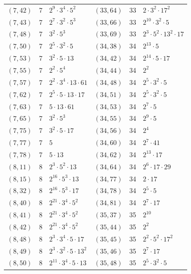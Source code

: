 \documentclass[11pt]{article}
\begin{document}
\begin{longtable}{@{}lrl@{\qquad}lrl@{}}
$(7,42)$ & 7 & $2^{9}\cdot 3^{4}\cdot 5^{2}$ & $(33,64)$ & 33 & $2\cdot 3^{2}\cdot 17^{2}$\\
$(7,43)$ & 7 & $2^{7}\cdot 3^{2}\cdot 5^{3}$ & $(33,66)$ & 33 & $2^{10}\cdot 3^{2}\cdot 5$\\
$(7,48)$ & 7 & $3^{2}\cdot 5^{3}$ & $(33,69)$ & 33 & $2^{3}\cdot 5^{2}\cdot 13^{2}\cdot 17$\\
$(7,50)$ & 7 & $2^{5}\cdot 3^{2}\cdot 5$ & $(34,38)$ & 34 & $2^{13}\cdot 5$\\
$(7,53)$ & 7 & $3^{2}\cdot 5\cdot 13$ & $(34,42)$ & 34 & $2^{14}\cdot 5\cdot 17$\\
$(7,55)$ & 7 & $2^{2}\cdot 5^{4}$ & $(34,44)$ & 34 & $2^{2}$\\
$(7,57)$ & 7 & $2^{2}\cdot 3^{4}\cdot 13\cdot 61$ & $(34,48)$ & 34 & $2^{5}\cdot 3^{2}\cdot 5$\\
$(7,62)$ & 7 & $2^{5}\cdot 5\cdot 13\cdot 17$ & $(34,51)$ & 34 & $2^{5}\cdot 3^{2}\cdot 5$\\
$(7,63)$ & 7 & $5\cdot 13\cdot 61$ & $(34,53)$ & 34 & $2^{7}\cdot 5$\\
$(7,65)$ & 7 & $3^{2}\cdot 5^{3}$ & $(34,55)$ & 34 & $2^{9}\cdot 5$\\
$(7,75)$ & 7 & $3^{2}\cdot 5\cdot 17$ & $(34,56)$ & 34 & $2^{4}$\\
$(7,77)$ & 7 & $5$ & $(34,60)$ & 34 & $2^{7}\cdot 41$\\
$(7,78)$ & 7 & $5\cdot 13$ & $(34,62)$ & 34 & $2^{13}\cdot 17$\\
$(8,11)$ & 8 & $2^{3}\cdot 5^{2}\cdot 13$ & $(34,64)$ & 34 & $2^{6}\cdot 17\cdot 29$\\
$(8,15)$ & 8 & $2^{16}\cdot 5^{3}\cdot 13$ & $(34,77)$ & 34 & $2\cdot 17$\\
$(8,32)$ & 8 & $2^{16}\cdot 5^{3}\cdot 17$ & $(34,78)$ & 34 & $2^{5}\cdot 5$\\
$(8,40)$ & 8 & $2^{21}\cdot 3^{4}\cdot 5^{2}$ & $(34,81)$ & 34 & $2^{7}\cdot 17$\\
$(8,41)$ & 8 & $2^{21}\cdot 3^{4}\cdot 5^{2}$ & $(35,37)$ & 35 & $2^{10}$\\
$(8,42)$ & 8 & $2^{21}\cdot 3^{4}\cdot 5^{2}$ & $(35,44)$ & 35 & $2^{2}$\\
$(8,48)$ & 8 & $2^{3}\cdot 3^{4}\cdot 5\cdot 17$ & $(35,45)$ & 35 & $2^{2}\cdot 5^{2}\cdot 17^{2}$\\
$(8,49)$ & 8 & $2^{3}\cdot 3^{2}\cdot 5\cdot 13^{2}$ & $(35,46)$ & 35 & $2^{7}\cdot 17$\\
$(8,50)$ & 8 & $2^{11}\cdot 3^{4}\cdot 5\cdot 13$ & $(35,48)$ & 35 & $2^{5}\cdot 3^{2}\cdot 5$\\

\end{longtable}
\end{document}
